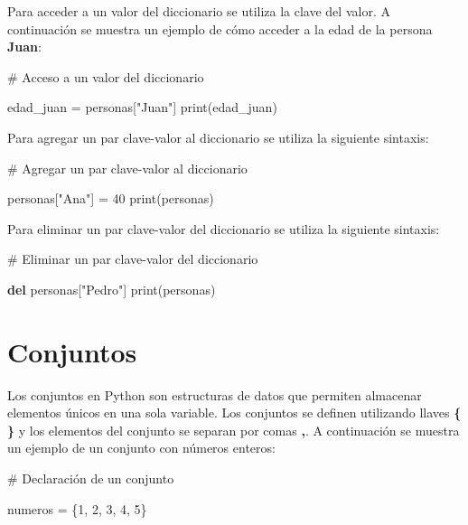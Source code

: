 \documentclass[
  a4paper,
  DIV=11,
  numbers=noendperiod,
  onepage,
  openany]{scrreprt}
\newenvironment{Shaded}{\begin{snugshade}}{\end{snugshade}}
\newcommand{\BuiltInTok}[1]{\textcolor[rgb]{0.00,0.23,0.31}{#1}}
\newcommand{\CommentTok}[1]{\textcolor[rgb]{0.37,0.37,0.37}{#1}}
\newcommand{\DecValTok}[1]{\textcolor[rgb]{0.68,0.00,0.00}{#1}}
\newcommand{\KeywordTok}[1]{\textcolor[rgb]{0.00,0.23,0.31}{\textbf{#1}}}
\newcommand{\NormalTok}[1]{\textcolor[rgb]{0.00,0.23,0.31}{#1}}
\newcommand{\OperatorTok}[1]{\textcolor[rgb]{0.37,0.37,0.37}{#1}}
\newcommand{\StringTok}[1]{\textcolor[rgb]{0.13,0.47,0.30}{#1}}
\begin{document}
Para acceder a un valor del diccionario se utiliza la clave del valor. A
continuación se muestra un ejemplo de cómo acceder a la edad de la
persona \textbf{Juan}:

\begin{Shaded}
\begin{Highlighting}[]
\CommentTok{\# Acceso a un valor del diccionario}

\NormalTok{edad\_juan }\OperatorTok{=}\NormalTok{ personas[}\StringTok{"Juan"}\NormalTok{]}
\BuiltInTok{print}\NormalTok{(edad\_juan)}
\end{Highlighting}
\end{Shaded}

Para agregar un par clave-valor al diccionario se utiliza la siguiente
sintaxis:

\begin{Shaded}
\begin{Highlighting}[]
\CommentTok{\# Agregar un par clave{-}valor al diccionario}

\NormalTok{personas[}\StringTok{"Ana"}\NormalTok{] }\OperatorTok{=} \DecValTok{40}
\BuiltInTok{print}\NormalTok{(personas)}
\end{Highlighting}
\end{Shaded}

Para eliminar un par clave-valor del diccionario se utiliza la siguiente
sintaxis:

\begin{Shaded}
\begin{Highlighting}[]
\CommentTok{\# Eliminar un par clave{-}valor del diccionario}

\KeywordTok{del}\NormalTok{ personas[}\StringTok{"Pedro"}\NormalTok{]}
\BuiltInTok{print}\NormalTok{(personas)}
\end{Highlighting}
\end{Shaded}

\section{Conjuntos}\label{conjuntos}

Los conjuntos en Python son estructuras de datos que permiten almacenar
elementos únicos en una sola variable. Los conjuntos se definen
utilizando llaves \textbf{\{ \}} y los elementos del conjunto se separan
por comas \textbf{,}. A continuación se muestra un ejemplo de un
conjunto con números enteros:

\begin{Shaded}
\begin{Highlighting}[]
\CommentTok{\# Declaración de un conjunto}

\NormalTok{numeros }\OperatorTok{=}\NormalTok{ \{}\DecValTok{1}\NormalTok{, }\DecValTok{2}\NormalTok{, }\DecValTok{3}\NormalTok{, }\DecValTok{4}\NormalTok{, }\DecValTok{5}\NormalTok{\}}
\end{Highlighting}
\end{Shaded}
\end{document}
